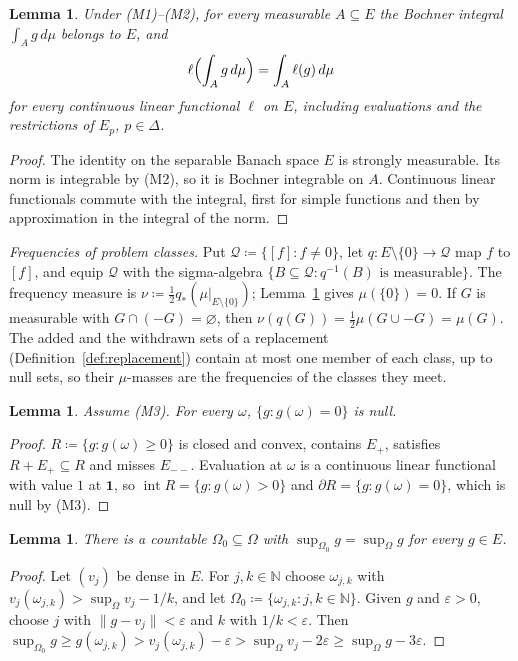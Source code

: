 \documentclass[11pt]{article}
\newtheorem{lemma}[theorem]{Lemma}
\theoremstyle{definition}
\theoremstyle{remark}
\newcommand{\one}{\mathbf 1}
\newcommand{\N}{\mathbb N}
\newcommand{\interior}{\operatorname{int}}
\newcommand{\bd}{\partial}
\begin{document}
\begin{lemma}\label{lem:integral}
Under (M1)--(M2), for every measurable $A\subseteq E$ the Bochner integral $\int_Ag\,d\mu$ belongs to $E$, and
\[
\ell\Bigl(\int_Ag\,d\mu\Bigr)=\int_A\ell(g)\,d\mu
\]
for every continuous linear functional $\ell$ on $E$, including evaluations and the restrictions of $E_p$, $p\in\Delta$.
\end{lemma}
\begin{proof}
The identity on the separable Banach space $E$ is strongly measurable. Its norm is integrable by (M2), so it is Bochner integrable on $A$. Continuous linear functionals commute with the integral, first for simple functions and then by approximation in the integral of the norm.
\end{proof}

\emph{Frequencies of problem classes.} Put $\mathcal Q\coloneqq\{[f]:f\ne0\}$, let $q:E\setminus\{0\}\to\mathcal Q$ map $f$ to $[f]$, and equip $\mathcal Q$ with the sigma-algebra $\{B\subseteq\mathcal Q:q^{-1}(B)\text{ is measurable}\}$. The frequency measure is $\nu\coloneqq\frac12q_*(\mu|_{E\setminus\{0\}})$; Lemma~\ref{lem:hyperplane} gives $\mu(\{0\})=0$. If $G$ is measurable with $G\cap(-G)=\varnothing$, then $\nu(q(G))=\frac12\mu(G\cup-G)=\mu(G)$. The added and the withdrawn sets of a replacement (Definition~\ref{def:replacement}) contain at most one member of each class, up to null sets, so their $\mu$-masses are the frequencies of the classes they meet.

\begin{lemma}\label{lem:hyperplane}
Assume (M3). For every $\omega$, $\{g:g(\omega)=0\}$ is null.
\end{lemma}
\begin{proof}
$R\coloneqq\{g:g(\omega)\ge0\}$ is closed and convex, contains $E_+$, satisfies $R+E_+\subseteq R$ and misses $E_{--}$. Evaluation at $\omega$ is a continuous linear functional with value $1$ at $\one$, so $\interior R=\{g:g(\omega)>0\}$ and $\bd R=\{g:g(\omega)=0\}$, which is null by (M3).
\end{proof}

\begin{lemma}\label{lem:detecting}
There is a countable $\Omega_0\subseteq\Omega$ with $\sup_{\Omega_0}g=\sup_\Omega g$ for every $g\in E$.
\end{lemma}
\begin{proof}
Let $(v_j)$ be dense in $E$. For $j,k\in\N$ choose $\omega_{j,k}$ with $v_j(\omega_{j,k})>\sup_\Omega v_j-1/k$, and let $\Omega_0\coloneqq\{\omega_{j,k}:j,k\in\N\}$. Given $g$ and $\varepsilon>0$, choose $j$ with $\|g-v_j\|<\varepsilon$ and $k$ with $1/k<\varepsilon$. Then $\sup_{\Omega_0}g\ge g(\omega_{j,k})>v_j(\omega_{j,k})-\varepsilon>\sup_\Omega v_j-2\varepsilon\ge\sup_\Omega g-3\varepsilon$.
\end{proof}
\end{document}
